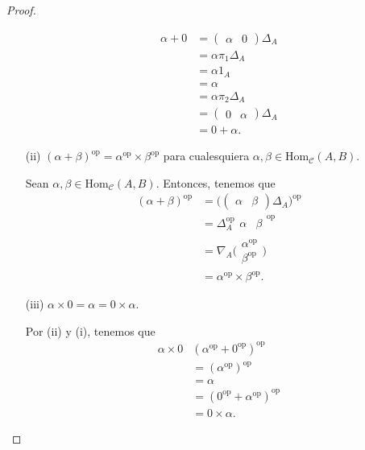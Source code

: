 \documentclass[tesis]{subfiles}
\begin{document}
\begin{proof}
\begin{itemize}
            \begin{align*}
                \alpha+0 &= (\begin{smallmatrix} \alpha &0 \end{smallmatrix})\Delta_A  \\
                         &= \alpha\pi_1\Delta_A \\
                         &= \alpha1_A \\
                         &= \alpha \\
                         &= \alpha\pi_2\Delta_A \\
                         &= (\begin{smallmatrix} 0 &\alpha \end{smallmatrix})\Delta_A \\
                         &= 0+\alpha.
            \end{align*}
            
        \item[(ii)] $(\alpha+\beta)^{\text{op}} = \alpha^{\text{op}}\times\beta^{\text{op}}$ para cualesquiera $\alpha,\beta\in\text{Hom}_\mathscr{C}(A,B)$.

            Sean $\alpha,\beta\in\text{Hom}_\mathscr{C}(A,B)$. Entonces, tenemos que
            \begin{align*}
                (\alpha+\beta)^{\text{op}} &= \big((\begin{smallmatrix} \alpha &\beta \end{smallmatrix})\Delta_A\big)^{\text{op}} \\
                                           &= \Delta_A^{\text{op}}\begin{smallmatrix} \alpha &\beta \end{smallmatrix}^{\text{op}} \\
                                           &= \nabla_A \big( \begin{smallmatrix} \alpha^{\text{op}} \\ \beta^{\text{op}} \end{smallmatrix}\big) \\
                                           &= \alpha^{\text{op}}\times\beta^{\text{op}}.
            \end{align*}

        \item[(iii)] $\alpha\times0=\alpha=0\times\alpha$.

            Por (ii) y (i), tenemos que
            \begin{align*}
                \alpha\times0 &(\alpha^{\text{op}}+0^{\text{op}})^{\text{op}} \\
                              &= (\alpha^{\text{op}})^{\text{op}} \\
                              &= \alpha \\
                              &= (0^{\text{op}}+\alpha^{\text{op}})^{\text{op}} \\
                              &= 0\times\alpha.
            \end{align*}


\end{itemize}
\end{proof}
\end{document}
